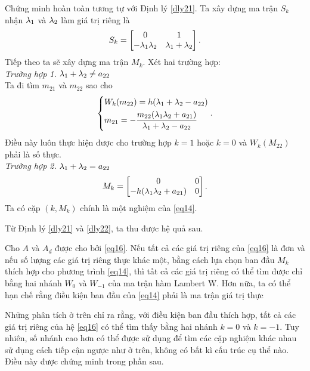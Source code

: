 \begin{cm}
Chứng minh hoàn toàn tương tự với Định lý \ref{dly21}. Ta xây dựng ma trận $S_k$ nhận $\lambda_1$ và $\lambda_2$ làm giá trị riêng là
\begin{equation}\label{eq32}
	S_k =\begin{bmatrix}
		0 & 1\\ 
		- \lambda_1 \lambda_2 & \lambda_1 + \lambda_2
	\end{bmatrix}.
\end{equation}
Tiếp theo ta sẽ xây dựng ma trận $M_k$. Xét hai trường hợp:\\
\noindent\textit{Trường hợp 1.} $\lambda_1 + \lambda_2 \ne a_{22}$\\
Ta đi tìm $m_{21}$ và $m_{22}$ sao cho
\begin{equation*}
	\left\{\begin{aligned}
		&W_k(m_{22}) = h  (\lambda_1 + \lambda_2 -a_{22})\\ 
		&m_{21} = - \dfrac{m_{22}(\lambda_1 \lambda_2+a_{21})}{\lambda_1  + \lambda_2 - a_{22}}
	\end{aligned}\right. . 
\end{equation*}
Điều này luôn thực hiện được cho trường hợp $k =1$ hoặc $k =0$ và $W_k(M_{22})$ phải là số thực. \\
\noindent\textit{Trường hợp 2.} $\lambda_1 + \lambda_2 = a_{22}$
\begin{equation*}
	M_k = \begin{bmatrix}
		0 & 0\\
		-h  (\lambda_1 \lambda_2 +a_{21}) & 0
	\end{bmatrix}.
\end{equation*}
Ta có cặp $(k, M_k)$ chính là một nghiệm của \eqref{eq14}.
\end{cm}

\noindent Từ Định lý \ref{dly21} và \ref{dly22}, ta thu được hệ quả sau.
  
\begin{hqua} \label{hqua21}
Cho $A$ và $A_d$ được cho bởi \eqref{eq16}. Nếu tất cả các giá trị riêng của \eqref{eq16} là đơn và  nếu số lượng các giá trị riêng thực khác một, bằng cách lựa chọn ban đầu $M_k$ thích hợp cho phương trình \eqref{eq14},  thì tất cả các giá trị riêng có thể tìm được chỉ bằng hai nhánh $W_0$ và $W_{-1}$ của ma trận hàm Lambert W. Hơn nữa, ta có thể hạn chế rằng điều kiện ban đầu của \eqref{eq14} phải là ma trận giá trị thực
\end{hqua}  

\begin{gch}
Những phân tích ở trên chỉ ra rằng, với điều kiện ban đầu thích hợp, tất cả các giá trị riêng của hệ \eqref{eq16} có thể tìm thấy bằng hai nhánh $k =0$ và $k = -1$. Tuy nhiên, số nhánh cao hơn có thể được sử dụng để tìm các cặp nghiệm khác nhau sử dụng cách tiếp cận ngược như ở trên, không có bất kì cấu trúc cụ thể nào. Điều này được chứng minh trong phần sau.
\end{gch}


